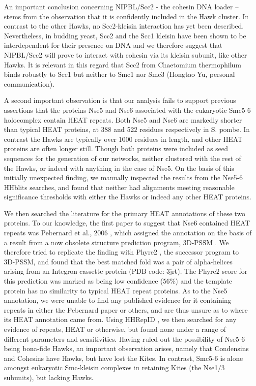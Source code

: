 \documentclass[a4paper,11pt,twoside,openright]{scrbook}
\begin{document}
An important conclusion concerning NIPBL/Scc2 - the cohesin DNA loader – stems from the observation that it is confidently included in the Hawk cluster. In contrast to the other Hawks, no Scc2-kleisin interaction has yet been described. Nevertheless, in budding yeast, Scc2 and the Scc1 kleisin have been shown to be interdependent for their presence on DNA \cite{Fernius2013} and we therefore suggest that NIPBL/Scc2 will prove to interact with cohesin via its kleisin subunit, like other Hawks. It is relevant in this regard that Scc2 from Chaetomium thermophilum binds robustly to Scc1 but neither to Smc1 nor Smc3 (Hongtao Yu, personal communication).

A second important observation is that our analysis fails to support previous assertions that the proteins Nse5 and Nse6 associated with the eukaryotic Smc5-6 holocomplex contain HEAT repeats. Both Nse5 and Nse6 are markedly shorter than typical HEAT proteins, at 388 and 522 residues respectively in S. pombe. In contrast the Hawks are typically over 1000 residues in length, and other HEAT proteins are often longer still. Though both proteins were included as seed sequences for the generation of our networks, neither clustered with the rest of the Hawks, or indeed with anything in the case of Nse5. On the basis of this initially unexpected finding, we manually inspected the results from the Nse5-6 HHblits searches, and found that neither had alignments meeting reasonable significance thresholds with either the Hawks or indeed any other HEAT proteins.

We then searched the literature for the primary HEAT annotations of these two proteins. To our knowledge, the first paper to suggest that Nse6 contained HEAT repeats was Pebernard et al., 2006 \cite{Pebernard2006}, which assigned the annotation on the basis of a result from a now obsolete structure prediction program, 3D-PSSM \cite{Kelley2000}. We therefore tried to replicate the finding with Phyre2 \cite{Kelley2015}, the successor program to 3D-PSSM, and found that the best matched fold was a pair of alpha-helices arising from an Integron cassette protein (PDB code: 3jrt). The Phyre2 score for this prediction was marked as being low confidence (56\%) and the template protein has no similarity to typical HEAT repeat proteins. As to the Nse5 annotation, we were unable to find any published evidence for it containing repeats in either the Pebernard paper or others, and are thus unsure as to where its HEAT annotation came from. Using HHRepID \cite{Biegert2008}, we then searched for any evidence of repeats, HEAT or otherwise, but found none under a range of different parameters and sensitivities. Having ruled out the possibility of Nse5-6 being bona-fide Hawks, an important observation arises, namely that Condensins and Cohesins have Hawks, but have lost the Kites. In contrast, Smc5-6 is alone amongst eukaryotic Smc-kleisin complexes in retaining Kites (the Nse1/3 subunits), but lacking Hawks.
\end{document}

